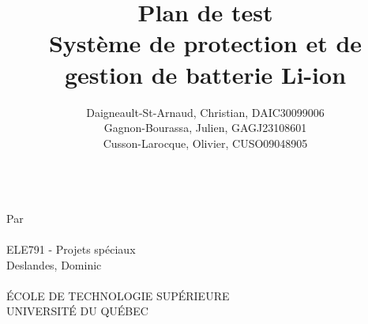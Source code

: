 
\title{
	\textbf{Plan de test} \\
	\vspace{2cm}
	Système de protection et de gestion de batterie Li-ion	
}
\author{
	Daigneault-St-Arnaud, Christian, DAIC30099006 \\
	Gagnon-Bourassa, Julien, GAGJ23108601 \\
	Cusson-Larocque, Olivier, CUSO09048905	
}
\newcommand{\cours}{ELE791 - Projets spéciaux }
\newcommand{\prof}{Deslandes, Dominic}



\makeatletter
\begin{titlepage}


	\centering
	{\Huge \@title}\\ 
	\vspace{3cm}
	{\large Par \\
		\vspace{0.5cm}
		\@author \\
		\vspace{3cm}
		\cours \\
		\vspace{0.5cm}
		\prof \\
		\vspace{3.5cm}
		\@date \\
		\vspace{3.5cm}
		\'{E}COLE DE TECHNOLOGIE SUP\'{E}RIEURE \\
		UNIVERSIT\'{E} DU QUÉBEC
	}
\end{titlepage}
\makeatother




